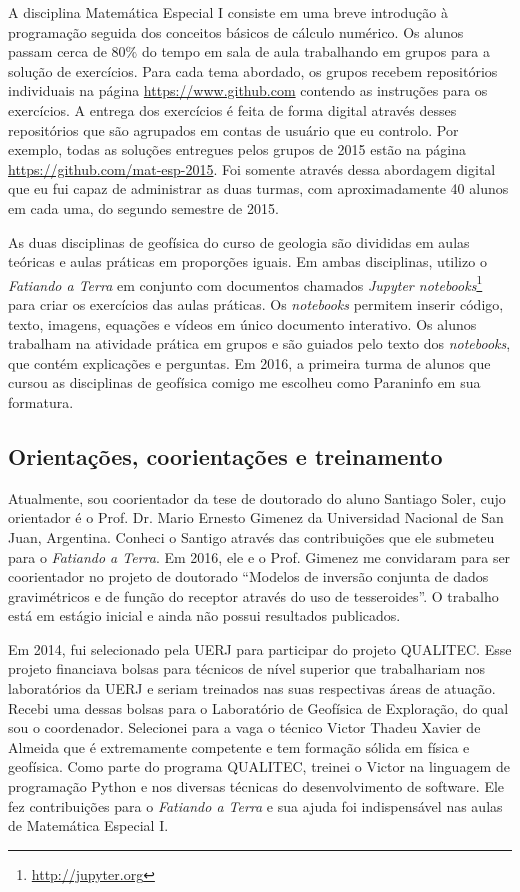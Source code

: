 A disciplina Matemática Especial I consiste em uma breve introdução à
programação seguida dos conceitos básicos de cálculo numérico.
Os alunos passam cerca de $80\%$ do tempo em sala de aula trabalhando em grupos
para a solução de exercícios.
Para cada tema abordado, os grupos recebem repositórios individuais na página
\url{https://www.github.com} contendo as instruções para os exercícios.
A entrega dos exercícios é feita de forma digital através desses repositórios
que são agrupados em contas de usuário que eu controlo.
Por exemplo, todas as soluções entregues pelos grupos de 2015 estão na página
\url{https://github.com/mat-esp-2015}.
Foi somente através dessa abordagem digital que eu fui capaz de administrar as
duas turmas, com aproximadamente 40 alunos em cada uma, do segundo semestre de
2015.


As duas disciplinas de geofísica do curso de geologia são divididas em aulas
teóricas e aulas práticas em proporções iguais.
Em ambas disciplinas, utilizo o \textit{Fatiando a Terra} em conjunto com
documentos chamados \textit{Jupyter
notebooks}\footnote{\url{http://jupyter.org}} para criar os exercícios das
aulas práticas.
Os \textit{notebooks} permitem inserir código, texto, imagens, equações e
vídeos em único documento interativo.
Os alunos trabalham na atividade prática em grupos e são guiados pelo texto dos
\textit{notebooks}, que contém explicações e perguntas.
Em 2016, a primeira turma de alunos que cursou as disciplinas de geofísica
comigo me escolheu como Paraninfo em sua formatura.



\subsection{Orientações, coorientações e treinamento}

Atualmente, sou coorientador da tese de doutorado do aluno Santiago Soler, cujo
orientador é o Prof. Dr. Mario Ernesto Gimenez da Universidad Nacional de San
Juan, Argentina.
Conheci o Santigo através das contribuições que ele submeteu para o
\textit{Fatiando a Terra}.
Em 2016, ele e o Prof. Gimenez me convidaram para ser coorientador no projeto
de doutorado ``Modelos de inversão conjunta de dados gravimétricos e de função
do receptor através do uso de tesseroides''.
O trabalho está em estágio inicial e ainda não possui resultados publicados.

Em 2014, fui selecionado pela UERJ para participar do projeto QUALITEC.
Esse projeto financiava bolsas para técnicos de nível superior que trabalhariam
nos laboratórios da UERJ e seriam treinados nas suas respectivas áreas de
atuação.
Recebi uma dessas bolsas para o Laboratório de Geofísica de Exploração, do qual
sou o coordenador.
Selecionei para a vaga o técnico Victor Thadeu Xavier de Almeida que é
extremamente competente e tem formação sólida em física e geofísica.
Como parte do programa QUALITEC, treinei o Victor na linguagem de programação
Python e nos diversas técnicas do desenvolvimento de software.
Ele fez contribuições para o \textit{Fatiando a Terra} e sua ajuda foi
indispensável nas aulas de Matemática Especial I.


